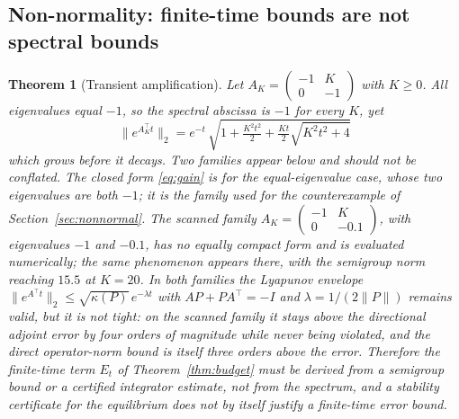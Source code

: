 \documentclass[11pt]{article}
\newtheorem{theorem}{Theorem}
\theoremstyle{definition}
\theoremstyle{remark}
\newcommand{\norm}[1]{\lVert #1 \rVert}
\begin{document}
\subsection{Non-normality: finite-time bounds are not spectral bounds}

\begin{theorem}[Transient amplification]\label{thm:nonnormal}
Let $A_K = \begin{pmatrix} -1 & K \\ 0 & -1 \end{pmatrix}$ with $K \ge 0$. All eigenvalues equal
$-1$, so the spectral abscissa is $-1$ for every $K$, yet
\begin{equation}
\norm{e^{A_K^{\top} t}}_2 = e^{-t}\,\sqrt{1 + \tfrac{K^2 t^2}{2} + \tfrac{K t}{2}\sqrt{K^2t^2 + 4}}
\label{eq:gain}
\end{equation}
which grows before it decays. Two families appear below and should not be conflated. The closed
form \eqref{eq:gain} is for the equal-eigenvalue case, whose two eigenvalues are both $-1$; it is
the family used for the counterexample of Section~\ref{sec:nonnormal}. The scanned family
$A_K = \begin{pmatrix} -1 & K \\ 0 & -0.1 \end{pmatrix}$, with eigenvalues $-1$ and $-0.1$, has no
equally compact form and is evaluated numerically; the same phenomenon appears there, with the
semigroup norm reaching $15.5$ at $K = 20$. In both families the Lyapunov envelope
$\norm{e^{A^{\top}t}}_2 \le \sqrt{\kappa(P)}\,e^{-\lambda t}$ with
$A P + P A^{\top} = -I$ and $\lambda = 1/(2\norm{P})$ remains valid, but it is not tight: on the
scanned family it stays above the directional adjoint error by four orders of magnitude while
never being violated, and the direct operator-norm bound is itself three orders above the error.
Therefore the finite-time term $E_t$ of Theorem~\ref{thm:budget} must be derived from a semigroup
bound or a certified integrator estimate, not from the spectrum, and a stability certificate for
the equilibrium does not by itself justify a finite-time error bound.
\end{theorem}
\end{document}
